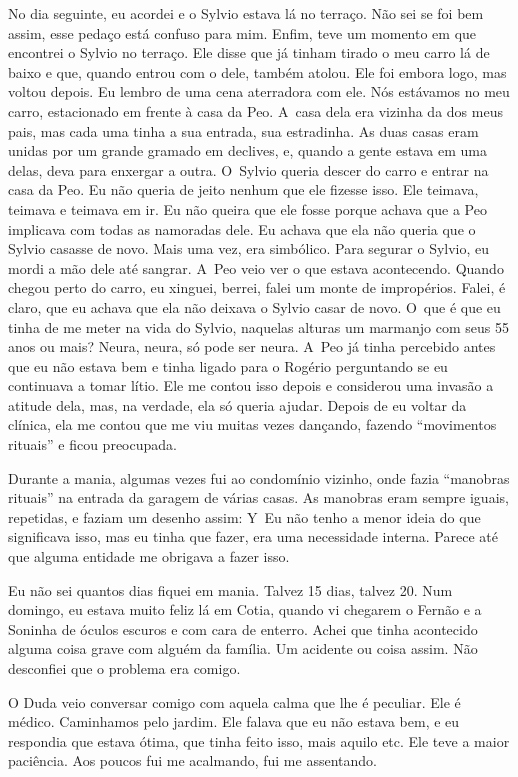 No dia seguinte, eu acordei e o Sylvio estava lá no terraço. Não sei se
foi bem assim, esse pedaço está confuso para mim. Enfim, teve um momento
em que encontrei o Sylvio no terraço. Ele disse que já tinham tirado o
meu carro lá de baixo e que, quando entrou com o dele, também atolou.
Ele foi embora logo, mas voltou depois. Eu lembro de uma cena aterradora
com ele. Nós estávamos no meu carro, estacionado em frente à casa da
Peo. A~casa dela era vizinha da dos meus pais, mas cada uma tinha a sua
entrada, sua estradinha. As duas casas eram unidas por um grande gramado
em declives, e, quando a gente estava em uma delas, deva para enxergar a
outra. O~Sylvio queria descer do carro e entrar na casa da Peo. Eu não
queria de jeito nenhum que ele fizesse isso. Ele teimava, teimava e
teimava em ir. Eu não queira que ele fosse porque achava que a Peo
implicava com todas as namoradas dele. Eu achava que ela não queria que
o Sylvio casasse de novo. Mais uma vez, era simbólico. Para segurar o
Sylvio, eu mordi a mão dele até sangrar. A~Peo veio ver o que estava
acontecendo. Quando chegou perto do carro, eu xinguei, berrei, falei um
monte de impropérios. Falei, é claro, que eu achava que ela não deixava
o Sylvio casar de novo. O~que é que eu tinha de me meter na vida do
Sylvio, naquelas alturas um marmanjo com seus 55 anos ou mais? Neura,
neura, só pode ser neura. A~Peo já tinha percebido antes que eu não
estava bem e tinha ligado para o Rogério perguntando se eu continuava a
tomar lítio. Ele me contou isso depois e considerou uma invasão a
atitude dela, mas, na verdade, ela só queria ajudar. Depois de eu voltar
da clínica, ela me contou que me viu muitas vezes dançando, fazendo
``movimentos rituais'' e ficou preocupada.

Durante a mania, algumas vezes fui ao condomínio vizinho, onde fazia
``manobras rituais'' na entrada da garagem de várias casas. As manobras
eram sempre iguais, repetidas, e faziam um desenho assim: Y\, Eu não
tenho a menor ideia do que significava isso, mas eu tinha que fazer, era
uma necessidade interna. Parece até que alguma entidade me obrigava a
fazer isso.

Eu não sei quantos dias fiquei em mania. Talvez 15 dias, talvez 20. Num
domingo, eu estava muito feliz lá em Cotia, quando vi chegarem o Fernão
e a Soninha de óculos escuros e com cara de enterro. Achei que tinha
acontecido alguma coisa grave com alguém da família. Um acidente ou
coisa assim. Não desconfiei que o problema era comigo.

O Duda veio conversar comigo com aquela calma que lhe é peculiar. Ele é
médico. Caminhamos pelo jardim. Ele falava que eu não estava bem, e eu
respondia que estava ótima, que tinha feito isso, mais aquilo etc. Ele
teve a maior paciência. Aos poucos fui me acalmando, fui me assentando.


